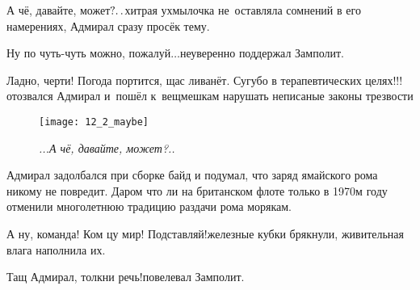 \diagdash А чё, давайте, может$\mathpunct{?\ldotp\ldotp}$\mdash хитрая ухмылочка не~оставляла сомнений в его намерениях, Адмирал сразу просёк тему.

\diagdash Ну по чуть-чуть можно, пожалуй$\ldots$\mdash неуверенно поддержал Замполит.


\diagdash Ладно, черти! Погода портится, щас ливанёт. Сугубо в терапевтических целях!!!\mdash отозвался Адмирал и~пошёл к~вещмешкам нарушать неписаные законы трезвости  

%
%


{
	\setlength{\belowcaptionskip}{-25pt}
	\begin{figure}[h]
		\centering
		\texttt{[image: 12\_2\_maybe]}
		\caption{\small\textit{...А чё, давайте, может?..}}
	\end{figure}
}

\noindent Адмирал задолбался при сборке байд и подумал, что заряд ямайского рома никому не повредит. Даром что ли на британском флоте только в 1970\sdash м году отменили многолетнюю традицию раздачи рома морякам.  

%

\diagdash А ну, команда! Ком цу мир! Подставляй!\mdash железные кубки брякнули, живительная влага наполнила их.

\diagdash Тащ Адмирал, толкни речь!\mdash повелевал Замполит.


\begingroup
\justifying
\parfillskip=0pt %


